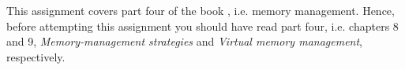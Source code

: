This assignment covers part four of the book \cite{Silberschatz2009osc}, i.e.  
memory management.
Hence, before attempting this assignment you should have read part four, i.e.  
chapters 8 and 9, \emph{Memory-management strategies} and \emph{Virtual memory 
management}, respectively.
